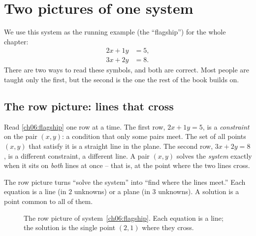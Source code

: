 \section{Two pictures of one system}

We use this system as the running example (the ``flagship'') for the whole
chapter:
\begin{equation}
  \label{ch06:flagship}
  \begin{aligned}
    2x + 1y &= 5,\\
    3x + 2y &= 8.
  \end{aligned}
\end{equation}
There are two ways to read these symbols, and both are correct. Most people
are taught only the first, but the second is the one the rest of the book
builds on.

\subsection{The row picture: lines that cross}

Read \eqref{ch06:flagship} one row at a time. The first row, $2x+1y=5$, is a
\emph{constraint} on the pair $(x,y)$: a condition that only some pairs meet. The set of all points $(x,y)$ that
satisfy it is a straight line in the plane. The second row, $3x+2y=8$, is a
different constraint, a different line. A pair $(x,y)$ solves the
\emph{system} exactly when it sits on \emph{both} lines at once -- that is,
at the point where the two lines cross.

\begin{intuitionbox}
The row picture turns ``solve the system'' into ``find where the lines
meet.'' Each equation is a line (in $2$ unknowns) or a plane (in $3$
unknowns). A solution is a point common to all of them.
\end{intuitionbox}

\begin{figure}[H]
\centering
{}
\caption{The row picture of system~\eqref{ch06:flagship}. Each equation is a
line; the solution is the single point $(2,1)$ where they cross.}
\label{ch06:rowpic}
\end{figure}

